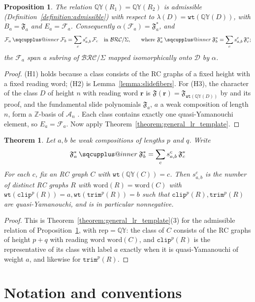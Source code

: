 \documentclass{amsart}
\makeatletter
\newcommand{\sqcupplus@inner}[2]{%
  \vcenter{\hbox{\ooalign{%
    \hfil$\m@th#1\sqcup$\hfil\cr
    \hfil\raisebox{0.15ex}{$\m@th#1\scriptscriptstyle+$}\hfil\cr
  }}}%
}
\newcommand{\sqcupplus}{\mathbin{\mathpalette\sqcupplus@inner\relax}}
\newtheorem{proposition}[lemma]{Proposition}
\newtheorem{theorem}{Theorem}[section]
\theoremstyle{definition}
\theoremstyle{remark}
\numberwithin{equation}{subsection}
\newcommand{\wtt}{\mathtt{wt}}
\newcommand{\QY}{\ensuremath{\mathbb{QY}}}
\newcommand{\trm}{\mathtt{trim}}
\newcommand{\clp}{\mathtt{clip}}
\newcommand{\BRC}{\mathcal{BRC}}
\newcommand{\coma}{\mathcal{A}}
\newcommand{\dcoma}{\mathcal{D}}
\makeatother
\begin{document}
\begin{proposition}\label{proposition:slidebasis}
The relation $\QY(R_1)=\QY(R_2)$ is admissible (Definition~\ref{definition:admissible}) with respect to $\lambda(D)=\wtt(\QY(D))$, with $B_a=\mathfrak{F}_a$ and $E_a=\mathcal{F}_a$. Consequently $\alpha(\mathcal{F}_a)=\mathfrak{F}_a^*$, and
$$\mathcal{F}_a\sqcupplus\mathcal{F}_b=\sum_cs_{a,b}^c\,\mathcal{F}_c\quad\text{in }\BRC/\Sigma\text{,}\qquad\text{where }\mathfrak{F}_a^*\sqcupplus\mathfrak{F}_b^*=\sum_cs_{a,b}^c\,\mathfrak{F}_c^*\text{;}$$
the $\mathcal{F}_a$ span a subring of $\BRC/\Sigma$ mapped isomorphically onto $\dcoma$ by $\alpha$.
\end{proposition}
\begin{proof}
(H1) holds because a class consists of the RC graphs of a fixed height with a fixed reading word; (H2) is Lemma~\ref{lemma:slidefibers}. For (H3), the character of the class $D$ of height $n$ with reading word $\mathbf r$ is $\mathfrak{F}(\mathbf r)=\mathfrak{F}_{\wtt(\QY(D))}$ by \cite[Theorem~3.13]{assaf2017slide} and its proof, and the fundamental slide polynomials $\mathfrak{F}_a$, $a$ a weak composition of length $n$, form a $\mathbb{Z}$-basis of $\coma_n$ \cite{assaf2017slide}. Each class contains exactly one quasi-Yamanouchi element, so $E_a=\mathcal{F}_a$. Now apply Theorem~\ref{theorem:general_lr_template}.
\end{proof}

\begin{theorem} \label{theorem:lrfslide}
  Let $a,b$ be weak compositions of lengths $p$ and $q$. Write
$$\mathfrak{F}_a^*\sqcupplus\mathfrak{F}_b^*=\sum_c s_{a,b}^c\,\mathfrak{F}_c^*$$
For each $c$, fix an RC graph $C$ with $\wtt(\QY(C)) = c$. Then $s_{a,b}^c$ is the number of distinct RC graphs $R$ with $\mathrm{word}(R)=\mathrm{word}(C)$ with $\wtt(\clp^p(R)) = a,\wtt(\trm^p(R)) = b$ such that $\clp^p(R),\trm^p(R)$ are quasi-Yamanouchi, and is in particular nonnegative.
\end{theorem}
\begin{proof}
This is Theorem~\ref{theorem:general_lr_template}(3) for the admissible relation of Proposition~\ref{proposition:slidebasis}, with $\mathrm{rep}=\QY$: the class of $C$ consists of the RC graphs of height $p+q$ with reading word $\mathrm{word}(C)$, and $\clp^p(R)$ is the representative of its class with label $a$ exactly when it is quasi-Yamanouchi of weight $a$, and likewise for $\trm^p(R)$.
\end{proof}

\section*{Notation and conventions}\label{section:notation}
\end{document}
